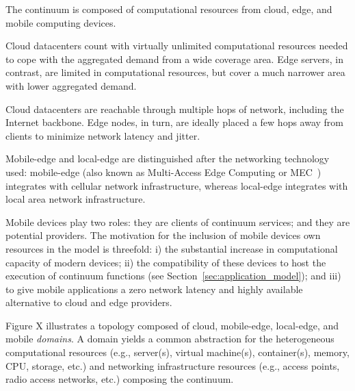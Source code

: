 The continuum is composed of computational resources from cloud, edge, and mobile computing devices. 

Cloud datacenters count with virtually unlimited computational resources needed to cope with the aggregated demand from a wide coverage area. Edge servers, in contrast, are limited in computational resources, but cover a much narrower area with lower aggregated demand. 

Cloud datacenters are reachable through multiple hops of network, including the Internet backbone. Edge nodes, in turn, are ideally placed a few hops away from clients to minimize network latency and jitter. 

Mobile-edge and local-edge are distinguished after the networking technology used: mobile-edge (also known as Multi-Access Edge Computing or MEC~\cite{ahmed2016isco}) integrates with cellular network infrastructure, whereas local-edge integrates with local area network infrastructure. %

Mobile devices play two roles: they are clients of continuum services; and they are potential providers. The motivation for the inclusion of mobile devices own resources in the model is threefold: i) the substantial increase in computational capacity of modern devices; ii) the compatibility of these devices to host the execution of continuum functions (see Section~\ref{sec:application_model}); and iii) to give mobile applications a zero network latency and highly available alternative to cloud and edge providers. 

Figure X illustrates a topology composed of cloud, mobile-edge, local-edge, and mobile \textit{domains}. A domain yields a common abstraction for the heterogeneous computational resources (e.g., server(s), virtual machine(s), container(s), memory, CPU, storage, etc.) and networking infrastructure resources (e.g., access points, radio access networks, etc.) composing the continuum.




